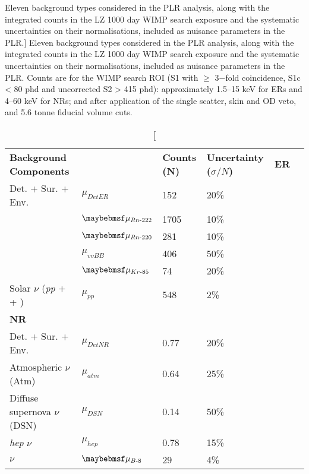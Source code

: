 \begin{table}[t!]
\centering
\caption
[Eleven background types considered in the PLR analysis, along with the integrated counts in the LZ 1000 day WIMP search exposure and the systematic uncertainties on their normalisations, included as nuisance parameters in the PLR.]
{Eleven background types considered in the PLR analysis, along with the integrated counts in the LZ 1000 day WIMP search exposure and the systematic uncertainties on their normalisations, included as nuisance parameters in the PLR. Counts are for the WIMP search ROI (S1 with $\geq$ 3−fold coincidence, S1c < 80 phd and uncorrected S2 > 415 phd): approximately 1.5–15 keV for ERs and 4–60 keV for NRs; and after application of the single scatter, skin and OD veto, and 5.6 tonne fiducial volume cuts.}
\label{tab:lz_pdf_estimations}
\vspace{1mm}
\renewcommand{\arraystretch}{1.2}
    \begin{tabularx}{0.9\linewidth}{@{\extracolsep{\fill}}llll}
    \toprule
    \textbf{Background Components} & %
    \textbf{} & %
    \textbf{Counts (N)} & %
    \textbf{Uncertainty ($\sigma/N$)} & %
    \hline
    \hline
    \textbf{ER}    &      &      \\
    Det. + Sur. + Env. & $\mu_{DetER}$ & 152 & 20\% \\
    \RnTTT{} & $\mu_{Rn\MathText{-}222}$ & 1705 & 10\% \\
    \RnTTZ{} & $\mu_{Rn\MathText{-}220}$ & 281 & 10\% \\
    \XeOTS{} \neutrinolessDoubleBeta{} & $\mu_{vvBB}$ & 406 & 50\% \\
    \KrEF{} & $\mu_{Kr\MathText{-}85}$ & 74 & 20\% \\
    Solar $\nu$ (\textit{pp} + \BeS{} + \NOT{}) & $\mu_{pp}$ & 548 & 2\% \\
    \textbf{NR}    &      &      \\
    Det. + Sur. + Env. & $\mu_{DetNR}$ & 0.77 & 20\% \\
    Atmospheric $\nu$ (Atm)  & $\mu_{atm}$ & 0.64 & 25\% \\
    Diffuse supernova $\nu$ (DSN) & $\mu_{DSN}$ & 0.14 & 50\% \\
    \textit{hep} $\nu$ & $\mu_{hep}$ & 0.78 & 15\% \\
    \BE{} $\nu$ & $\mu_{B\MathText{-}8}$ & 29 & 4\% \\
    
    \bottomrule
    \end{tabularx}
\end{table}